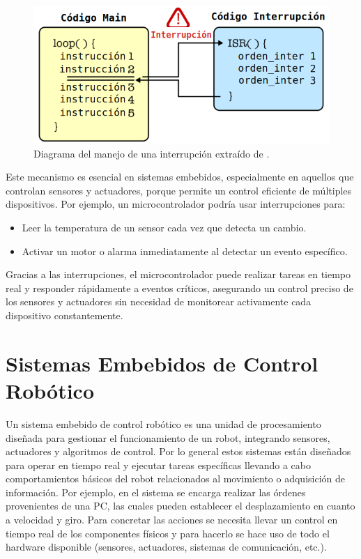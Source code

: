 \begin{figure}[H]
	\centering
    \includegraphics[width=0.7\linewidth]{components_interrupt.png}
    \caption{Diagrama del manejo de una interrupción extraído de \cite{imgInterrupciones}.}
    \label{interrupt}
\end{figure}

Este mecanismo es esencial en sistemas embebidos, especialmente en aquellos que controlan sensores y actuadores, porque permite un control eficiente de múltiples dispositivos. Por ejemplo, un microcontrolador podría usar interrupciones para:

\begin{itemize}
    \item Leer la temperatura de un sensor cada vez que detecta un cambio.
    \item Activar un motor o alarma inmediatamente al detectar un evento específico.
\end{itemize}

Gracias a las interrupciones, el microcontrolador puede realizar tareas en tiempo real y responder rápidamente a eventos críticos, asegurando un control preciso de los sensores y actuadores sin necesidad de monitorear activamente cada dispositivo constantemente.


\section{Sistemas Embebidos de Control Robótico}
\label{sistControl}

Un sistema embebido de control robótico es una unidad de procesamiento diseñada para gestionar el funcionamiento de un robot, integrando sensores, actuadores y algoritmos de control. Por lo general estos sistemas están diseñados para operar en tiempo real y ejecutar tareas específicas llevando a cabo comportamientos básicos del robot relacionados al movimiento o adquisición de información. Por ejemplo, en \cite{paperPomponio} el sistema se encarga realizar las órdenes provenientes de una PC, las cuales pueden establecer el desplazamiento en cuanto a velocidad y giro. Para concretar las acciones se necesita llevar un control en tiempo real de los componentes físicos y para hacerlo se hace uso de todo el hardware disponible (sensores, actuadores, sistemas de comunicación, etc.).

